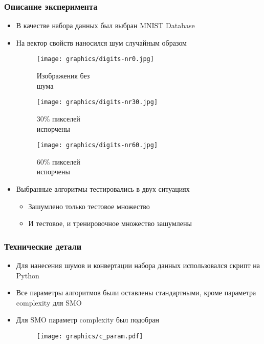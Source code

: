 \documentclass{beamer}
\begin{document}
  
  
  \begin{frame}
    \frametitle{Описание эксперимента}
    	\begin{itemize}
    	\item{В качестве набора данных был выбран MNIST Database}
    	\item{На вектор свойств наносился шум случайным образом}
    	\begin{figure}[ht!b]
		\centering
		\begin{minipage}{.25\textwidth}
			\texttt{[image: graphics/digits-nr0.jpg]}
			\captionsetup{justification=centering}
			\caption*{Изображения без\\ шума}
		\end{minipage}
		\begin{minipage}{.25\textwidth}
			\texttt{[image: graphics/digits-nr30.jpg]}
			\captionsetup{justification=centering}
			\caption*{ 30\% пикселей\\ испорчены}
		\end{minipage}
		\begin{minipage}{.25\textwidth}
			\texttt{[image: graphics/digits-nr60.jpg]}
			\captionsetup{justification=centering}
			\caption*{ 60\% пикселей\\ испорчены}
		\end{minipage}
		\label{fig:noise}
		\end{figure}
		\item{Выбранные алгоритмы тестировались в двух ситуациях}
    		\begin{itemize}
    		\item{Зашумлено только тестовое множество}
    		\item{И тестовое, и тренировочное множество зашумлены}
    		\end{itemize}
    \end{itemize}
  \end{frame}
  
  
  \begin{frame}
  	\frametitle{Технические детали}
  		\begin{itemize}
  		\item{Для нанесения шумов и конвертации набора данных использовался скрипт 					на Python}
    	\item{Все параметры алгоритмов были оставлены стандартными, кроме 					параметра complexity для SMO}
		\item{Для SMO параметр complexity был подобран}
		\begin{figure}[ht!]
		\texttt{[image: graphics/c\_param.pdf]}
		\captionsetup{justification=centering}
		\label{fig:SMO_qual}
		\end{figure}
    \end{itemize}
  \end{frame}
  
\end{document}
